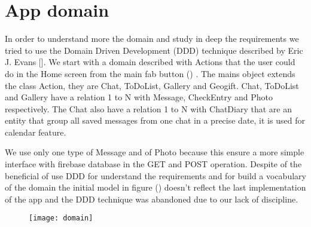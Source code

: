 
\section{App domain}
\label{sec:app-domain}

In order to understand more the domain and study in deep the requirements we tried to use the Domain Driven Development (DDD) technique described by Eric J. Evans []. We start with a domain described with Actions that the user could do in the Home screen from the main fab button () .
The mains object extends the class Action, they are Chat, ToDoList, Gallery and Geogift. Chat, ToDoList and Gallery have a relation 1 to N with Message, CheckEntry and Photo respectively. The Chat also have a relation 1 to N with ChatDiary that are an entity that group all saved messages from one chat in a precise date, it is used for calendar feature. 

We use only one type of Message and of Photo because this ensure a more simple interface with firebase database in the GET and POST operation. Despite of the beneficial of use DDD for understand the requirements and for build a vocabulary of the domain the initial model in figure () doesn’t reflect the last implementation of the app and the DDD technique was abandoned due to our lack of discipline.

\begin{figure}[hb]
	\texttt{[image: domain]}
\end{figure}